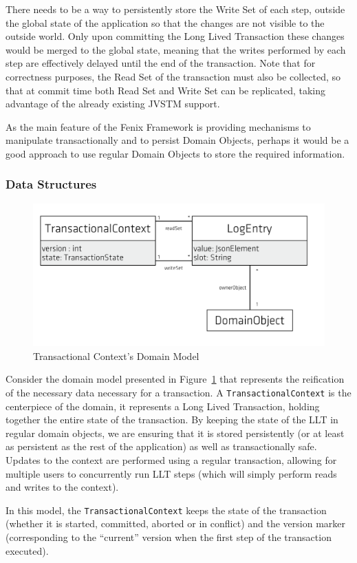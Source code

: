 \documentclass{llncs}
\begin{document}
There needs to be a way to persistently store the Write Set of each
step, outside the global state of the application so that the changes
are not visible to the outside world. Only upon committing the Long
Lived Transaction these changes would be merged to the global state,
meaning that the writes performed by each step are effectively delayed
until the end of the transaction. Note that for correctness purposes,
the Read Set of the transaction must also be collected, so that at
commit time both Read Set and Write Set can be replicated, taking
advantage of the already existing JVSTM support.

As the main feature of the Fenix Framework is providing mechanisms to
manipulate transactionally and to persist Domain Objects, perhaps it
would be a good approach to use regular Domain Objects to store the
required information.

\subsubsection{Data Structures}

\begin{figure}
\centering
\includegraphics[width=0.5\linewidth]{tx-context}
\caption{Transactional Context's Domain Model}
\label{fig:transactionalContext}
\end{figure}

Consider the domain model presented in
Figure~\ref{fig:transactionalContext} that represents the reification
of the necessary data necessary for a transaction. A
\texttt{TransactionalContext} is the centerpiece of the domain, it
represents a Long Lived Transaction, holding together the entire state
of the transaction. By keeping the state of the LLT in regular domain
objects, we are ensuring that it is stored persistently (or at least
as persistent as the rest of the application) as well as
transactionally safe. Updates to the context are performed using a
regular transaction, allowing for multiple users to concurrently run
LLT steps (which will simply perform reads and writes to the context).

In this model, the \texttt{TransactionalContext} keeps the state of
the transaction (whether it is started, committed, aborted or in
conflict) and the version marker (corresponding to the ``current''
version when the first step of the transaction executed).
\end{document}
